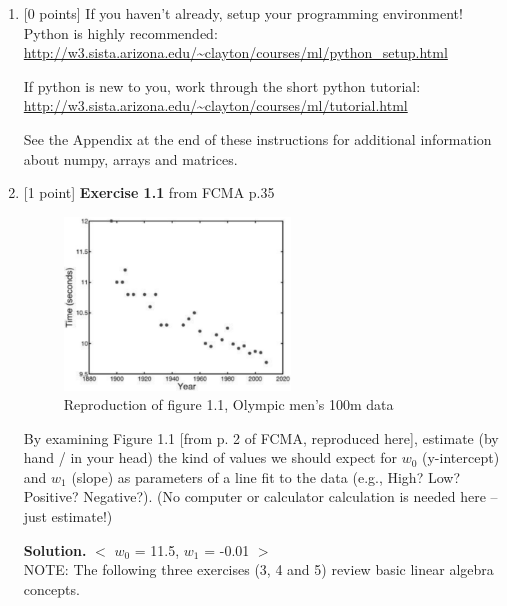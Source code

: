 \documentclass[10pt]{article}
\begin{document}
\newpage
\begin{enumerate}


\item \label{prob:1} [0 points]
If you haven't already, setup your programming environment!  Python is highly recommended:\\
\url{http://w3.sista.arizona.edu/~clayton/courses/ml/python_setup.html}

If python is new to you, work through the short python tutorial:\\
\url{http://w3.sista.arizona.edu/~clayton/courses/ml/tutorial.html}

See the Appendix at the end of these instructions for additional information about numpy, arrays and matrices.



\item \label{prob:2} [1 point]
{\bf Exercise 1.1} from FCMA p.35

\begin{figure}[htb]
\begin{center}
\includegraphics[width=6cm]{figures/figure1-1_p2}
\caption{Reproduction of figure 1.1, Olympic men's 100m data}
\end{center}
\end{figure}
By examining Figure 1.1 [from p. 2 of FCMA, reproduced here], estimate (by hand / in your head) the kind of values we should expect for $w_0$ (y-intercept) and $w_1$ (slope) as parameters of a line fit to the data (e.g., High? Low?  Positive?  Negative?).  (No computer or calculator calculation is needed here -- just estimate!)

{\bf Solution.} $<$ $w_0$ = 11.5, $w_1$ = -0.01 $>$\\


\newpage
NOTE: The following three exercises (3, 4 and 5) review basic linear algebra concepts.


\end{enumerate}
\end{document}
